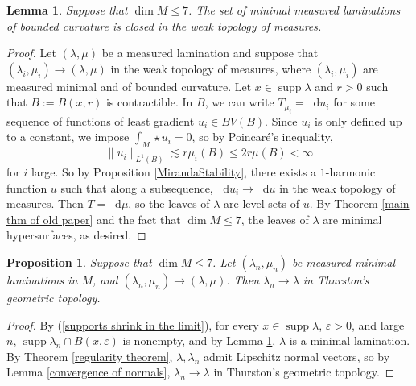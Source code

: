 \documentclass[reqno,11pt]{amsart}
\newcommand*\dif{\mathop{}\!\mathrm{d}}
\DeclareMathOperator{\supp}{supp}
\newtheorem{lemma}[theorem]{Lemma}
\newtheorem{proposition}[theorem]{Proposition}
\theoremstyle{definition}
\numberwithin{equation}{section}
\begin{document}
\begin{lemma}\label{limits of measured geodesic lams are geodesic}
Suppose that $\dim M \leq 7$. The set of minimal measured laminations of bounded curvature is closed in the weak topology of measures.
\end{lemma}
\begin{proof}
Let $(\lambda, \mu)$ be a measured lamination and suppose that $(\lambda_i, \mu_i) \to (\lambda, \mu)$ in the weak topology of measures, where $(\lambda_i, \mu_i)$ are measured minimal and of bounded curvature.
Let $x \in \supp \lambda$ and $r > 0$ such that $B := B(x, r)$ is contractible.
In $B$, we can write $T_{\mu_i} = \dif u_i$ for some sequence of functions of least gradient $u_i \in BV(B)$.
Since $u_i$ is only defined up to a constant, we impose $\int_M \star u_i = 0$, so by Poincar\'e's inequality,
$$\|u_i\|_{L^1(B)} \lesssim r\mu_i(B) \leq 2r \mu(B) < \infty$$
for $i$ large.
So by Proposition \ref{MirandaStability}, there exists a $1$-harmonic function $u$ such that along a subsequence, $\dif u_i \to \dif u$ in the weak topology of measures.
Then $T = \dif \mu$, so the leaves of $\lambda$ are level sets of $u$.
By Theorem \ref{main thm of old paper} and the fact that $\dim M \leq 7$, the leaves of $\lambda$ are minimal hypersurfaces, as desired.
\end{proof}

\begin{proposition}
Suppose that $\dim M \leq 7$.
Let $(\lambda_n, \mu_n)$ be measured minimal laminations in $M$, and $(\lambda_n, \mu_n) \to (\lambda, \mu)$.
Then $\lambda_n \to \lambda$ in Thurston's geometric topology.
\end{proposition}
\begin{proof}
By (\ref{supports shrink in the limit}), for every $x \in \supp \lambda$, $\varepsilon > 0$, and large $n$, $\supp \lambda_n \cap B(x, \varepsilon)$ is nonempty, and by Lemma \ref{limits of measured geodesic lams are geodesic}, $\lambda$ is a minimal lamination.
By Theorem \ref{regularity theorem}, $\lambda, \lambda_n$ admit Lipschitz normal vectors, so by Lemma \ref{convergence of normals}, $\lambda_n \to \lambda$ in Thurston's geometric topology.
\end{proof}
\end{document}
